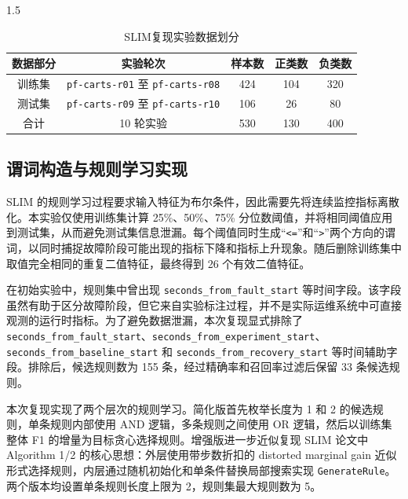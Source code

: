 \documentclass[a4paper,12pt]{report}
\begin{document}
\begin{spacing}{1.5}
\begin{table}[H]
\centering
\caption{SLIM复现实验数据划分}
\begin{tabular}{ccccc}
\toprule
\textbf{数据部分} & \textbf{实验轮次} & \textbf{样本数} & \textbf{正类数} & \textbf{负类数} \\
\midrule
训练集 & \texttt{pf-carts-r01} 至 \texttt{pf-carts-r08} & 424 & 104 & 320 \\
测试集 & \texttt{pf-carts-r09} 至 \texttt{pf-carts-r10} & 106 & 26 & 80 \\
合计 & 10 轮实验 & 530 & 130 & 400 \\
\bottomrule
\end{tabular}
\end{table}

\subsection{谓词构造与规则学习实现}

SLIM 的规则学习过程要求输入特征为布尔条件，因此需要先将连续监控指标离散化。本实验仅使用训练集计算 25\%、50\%、75\% 分位数阈值，并将相同阈值应用到测试集，从而避免测试集信息泄漏。每个阈值同时生成“\texttt{<=}”和“\texttt{>}”两个方向的谓词，以同时捕捉故障阶段可能出现的指标下降和指标上升现象。随后删除训练集中取值完全相同的重复二值特征，最终得到 26 个有效二值特征。

\begin{sloppypar}
在初始实验中，规则集中曾出现 \texttt{seconds\_from\_fault\_start} 等时间字段。该字段虽然有助于区分故障阶段，但它来自实验标注过程，并不是实际运维系统中可直接观测的运行时指标。为了避免数据泄漏，本次复现显式排除了 \texttt{seconds\_from\_fault\_start}、\texttt{seconds\_from\_experiment\_start}、\texttt{seconds\_from\_baseline\_start} 和 \texttt{seconds\_from\_recovery\_start} 等时间辅助字段。排除后，候选规则数为 155 条，经过精确率和召回率过滤后保留 33 条候选规则。
\end{sloppypar}

本次复现实现了两个层次的规则学习。简化版首先枚举长度为 1 和 2 的候选规则，单条规则内部使用 AND 逻辑，多条规则之间使用 OR 逻辑，然后以训练集整体 F1 的增量为目标贪心选择规则。增强版进一步近似复现 SLIM 论文中 Algorithm 1/2 的核心思想：外层使用带步数折扣的 distorted marginal gain 近似形式选择规则，内层通过随机初始化和单条件替换局部搜索实现 \texttt{GenerateRule}。两个版本均设置单条规则长度上限为 2，规则集最大规则数为 5。


\end{spacing}
\end{document}
